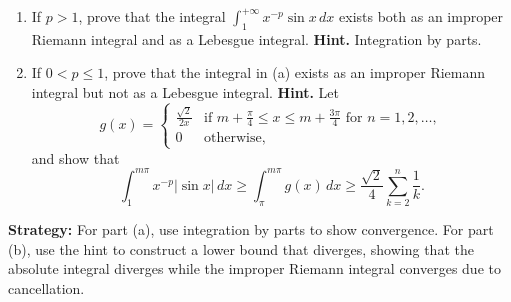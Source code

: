 \begin{problembox}
\begin{enumerate}[label=(\alph*)]
\item If $p > 1$, prove that the integral $\int_1^{+\infty} x^{-p} \sin x \, dx$ exists both as an improper Riemann integral and as a Lebesgue integral. \textbf{Hint.} Integration by parts.
\item If $0 < p \leq 1$, prove that the integral in (a) exists as an improper Riemann integral but not as a Lebesgue integral. \textbf{Hint.} Let
\[g(x) = 
\begin{cases} 
\frac{\sqrt{2}}{2x} & \text{if } m + \frac{\pi}{4} \leq x \leq m + \frac{3\pi}{4} \text{ for } n = 1, 2, \ldots, \\ 
0 & \text{otherwise},
\end{cases}\]
and show that
\[\int_{1}^{m\pi} x^{-p} |\sin x| \, dx \geq \int_{\pi}^{m\pi} g(x) \, dx \geq \frac{\sqrt{2}}{4} \sum_{k=2}^{n} \frac{1}{k}.\]
\end{enumerate}
\end{problembox}

\noindent\textbf{Strategy:} For part (a), use integration by parts to show convergence. For part (b), use the hint to construct a lower bound that diverges, showing that the absolute integral diverges while the improper Riemann integral converges due to cancellation.


